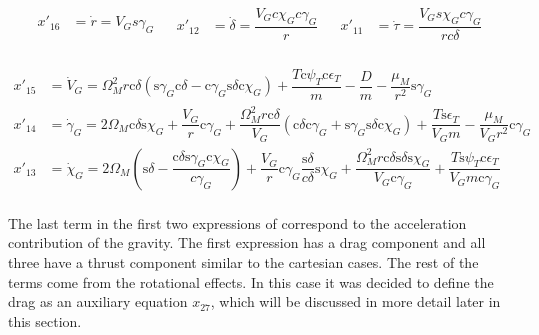 \begin{align} \label{eq:kinEqSp}
\begin{split}
x'_{16} &= \dot{r} = V_{G} s \gamma_{G} \\
\end{split}
&
\begin{split}
x'_{12} &= \dot{\delta} = \dfrac{V_{G} c \chi_{G} c \gamma_{G}}{r} \\
\end{split}
&
\begin{split}
x'_{11} &= \dot{\tau} = \dfrac{V_{G} s \chi_{G} c \gamma_{G}}{r c \delta} \\
\end{split}
\end{align}


\begin{equation} \label{eq:dynEqSp}
\begin{split}
x'_{15} &= \dot{V}_{G} =  \Omega_{M}^{2} r \text{c}\delta \left(\text{s}\gamma_{G}\text{c}\delta-\text{c}\gamma_{G}\text{s}\delta \text{c}\chi_{G}\right)+\dfrac{T\text{c}\psi_{T}\text{c}\epsilon_{T}}{m}-\dfrac{D}{m}-\dfrac{\mu_{M}}{r^{2}}\text{s}\gamma_{G} \\
x'_{14} &= \dot{\gamma}_{G} = 2\Omega_{M}\text{c}\delta \text{s}\chi_{G} + \dfrac{V_{G}}{r}\text{c}\gamma_{G}+\dfrac{\Omega_{M}^{2}r \text{c}\delta}{V_{G}}\left(\text{c}\delta \text{c}\gamma_{G}+\text{s}\gamma_{G} \text{s}\delta \text{c}\chi_{G}\right)+\dfrac{T \text{s}\epsilon_{T}}{V_{G}m}-\dfrac{\mu_{M}}{V_{G}r^{2}}\text{c}\gamma_{G} \\
x'_{13} &= \dot{\chi}_{G} = 2 \Omega_{M} \left(\text{s}\delta-\dfrac{\text{c}\delta \text{s}\gamma_{G} \text{c}\chi_{G}}{c \gamma_{G}}\right)+\dfrac{V_{G}}{r}\text{c}\gamma_{G}\dfrac{\text{s}\delta}{c \delta}\text{s}\chi_{G}+\dfrac{\Omega_{M}^{2}r \text{c}\delta \text{s}\delta \text{s}\chi_{G}}{V_{G}\text{c}\gamma_{G}}+\dfrac{T \text{s}\psi_{T}\text{c}\epsilon_{T}}{V_{G}m \text{c}\gamma_{G}} \\
\end{split}
\end{equation}

\noindent
The last term in the first two expressions of  correspond to the acceleration contribution of the gravity. The first expression has a drag component and all three have a thrust component similar to the cartesian cases. The rest of the terms come from the rotational effects. In this case it was decided to define the drag as an auxiliary equation $x_{27}$, which will be discussed in more detail later in this section.

